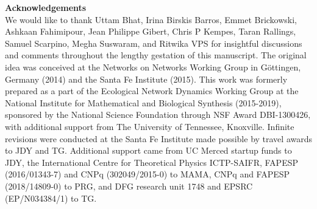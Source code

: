 \documentclass[twocolumn,preprintnumbers,amsmath,amssymb,superscriptaddress,linenumbers]{revtex4-1}
\begin{document}
% 
% 
% 
% 
% 
% 


\vspace{2mm}
\noindent \textbf{Acknowledgements}\\
  \footnotesize{
  We would like to thank
  Uttam Bhat,
  Irina Birskis Barros,
  Emmet Brickowski,
  Ashkaan Fahimipour,
  Jean Philippe Gibert,
  Chris P Kempes,
  Taran Rallings,
  Samuel Scarpino,
  Megha Suswaram,
  and Ritwika VPS 
  for insightful discussions and comments throughout the lengthy gestation of this manuscript.
  The original idea was conceived at the Networks on Networks Working Group in G\"ottingen, Germany (2014) and the Santa Fe Institute (2015).
  This work was formerly prepared as a part of the Ecological Network Dynamics Working Group at the National Institute for Mathematical and Biological Synthesis (2015-2019), sponsored by the National Science Foundation through NSF Award DBI-1300426, with additional support from The University of Tennessee, Knoxville.
  Infinite revisions were conducted at the Santa Fe Institute made possible by travel awards to JDY and TG.
  Additional support came from UC Merced startup funds to JDY, the International Centre for Theoretical Physics ICTP-SAIFR, FAPESP (2016/01343-7) and CNPq (302049/2015-0) to MAMA, CNPq and FAPESP (2018/14809-0) to PRG, and DFG research unit 1748 and EPSRC (EP/N034384/1) to TG.
  }\\ \\
  
\end{document}
